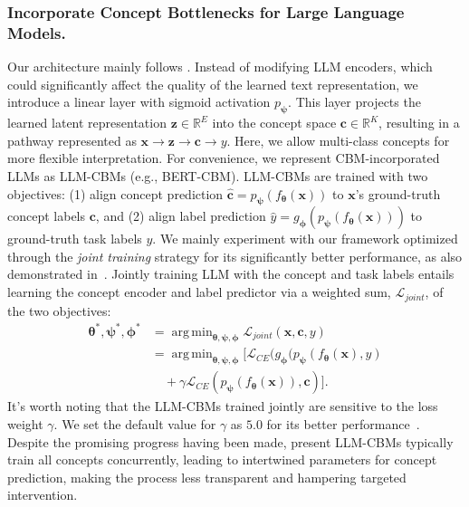 \documentclass[letterpaper]{article} %
\DeclareMathOperator*{\argmin}{arg\,min}
\begin{document}
\subsubsection{Incorporate Concept Bottlenecks for Large Language Models.} Our architecture mainly follows \citet{tan2023cbm}. Instead of modifying LLM encoders, which could significantly affect the quality of the learned text representation, we introduce a linear layer with sigmoid activation $p_{\bm{\psi}}$. This layer projects the learned latent representation $\bm{z} \in \mathbb{R}^E$ into the concept space $\bm{c} \in \mathbb{R}^K$, resulting in a pathway represented as $\bm{x} \rightarrow \bm{z} \rightarrow \bm{c} \rightarrow y$. Here, we allow multi-class concepts for more flexible interpretation. For convenience, we represent CBM-incorporated LLMs as LLM-CBMs (e.g., BERT-CBM). LLM-CBMs are trained with two objectives: (1) align concept prediction $\hat{\bm{c}}=p_{\bm\psi}(f_{\bm\theta}(\bm{x}))$ to $\bm{x}$’s ground-truth concept labels $\bm{c}$, and (2) align label prediction $\hat{y}=g_{\bm\phi}(p_{\bm\psi}(f_{\bm\theta}(\bm{x})))$ to ground-truth task labels $y$. We mainly experiment with our framework optimized through the \textit{joint training} strategy for its significantly better performance, as also demonstrated in~\citet{tan2023cbm}.
Jointly training LLM with the concept and task labels entails learning the concept encoder and label predictor via a weighted sum, $\mathcal{L}_{joint}$, of the two objectives:
\begin{equation} \label{eq:joint}
\begin{aligned}
    \bm{\theta}^{\ast}, \bm{\psi}^{\ast}, \bm{\phi}^{\ast} &= \argmin_{\bm{\theta}, \bm{\psi}, \bm{\phi}} \mathcal{L}_{joint}(\bm{x}, \bm{c}, y) \\ &= \argmin_{\bm{\theta}, \bm{\psi}, \bm{\phi}} [\mathcal{L}_{CE} (g_{\bm{\phi}}(p_{\bm{\psi}}(f_{\bm{\theta}}(\bm{x}),y) \\ &\quad+ \gamma \mathcal{L}_{CE} (p_{\bm{\psi}}(f_{\bm{\theta}}(\bm{x})),\bm{c})].
\end{aligned}
\end{equation}
It's worth noting that the LLM-CBMs trained jointly are sensitive to the loss weight $\gamma$. We set the default value for $\gamma$ as $5.0$ for its better performance~\citep{tan2023cbm}. Despite the promising progress having been made, present LLM-CBMs typically train all concepts concurrently, leading to intertwined parameters for concept prediction, making the process less transparent and hampering targeted intervention.
\end{document}
